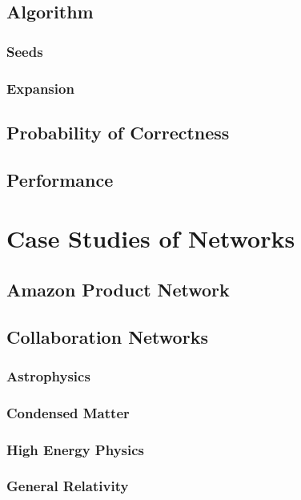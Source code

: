 \documentclass[phd,tocprelim]{cornell}
\begin{document}
\section{Algorithm}

\subsection{Seeds}

\subsection{Expansion}

\section{Probability of Correctness}

\section {Performance}

\chapter{Case Studies of Networks}

\section{Amazon Product Network}



\section{Collaboration Networks}

\subsection{Astrophysics}

\subsection{Condensed Matter}

\subsection{High Energy Physics}

\subsection{General Relativity}
\end{document}
